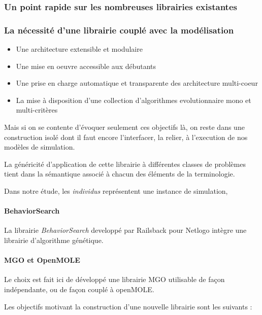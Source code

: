 \subsubsection{Un point rapide sur les nombreuses librairies existantes}

\subsubsection{La nécessité d'une librairie couplé avec la modélisation}

\begin{itemize}
	\item Une architecture extensible et modulaire
	\item Une mise en oeuvre accessible aux débutants
	\item Une prise en charge automatique et transparente des architecture multi-coeur 
	\item La mise à disposition d'une collection d'algorithmes evolutionnaire mono et multi-critères 
\end{itemize}

Mais si on se contente d'évoquer seulement ces objectifs là, on reste dans une construction isolé dont il faut encore l'interfacer, la relier, à l'execution de nos modèles de simulation.

La généricité d'application de cette librairie à différentes classes de problèmes tient dans la sémantique associé à chacun des éléments de la terminologie. 

Dans notre étude, les \textit{individus} représentent une instance de simulation,



\paragraph{BehaviorSearch}

La librairie \textit{BehaviorSearch} developpé par Railsback pour Netlogo intègre une librairie d'algorithme génétique.

\paragraph{MGO et OpenMOLE}

Le choix est fait ici de développé une librairie MGO utilisable de façon indépendante, ou de façon couplé à openMOLE. 

Les objectifs motivant la construction d'une nouvelle librairie sont les suivants : 



